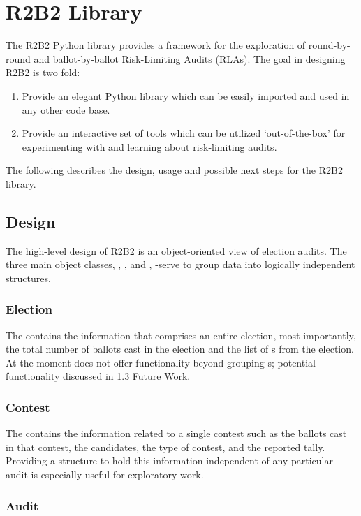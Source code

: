 \section{R2B2 Library}

The R2B2 Python library provides a framework for the exploration of round-by-round
and ballot-by-ballot Risk-Limiting Audits (RLAs). The goal in designing R2B2 is two fold:
\begin{enumerate}
    \item Provide an elegant Python library which can be easily imported and used
    in any other code base.
    \item Provide an interactive set of tools which can be utilized `out-of-the-box'
    for experimenting with and learning about risk-limiting audits.
\end{enumerate}
The following describes the design, usage and possible next steps for the R2B2 library.

\subsection{Design}

The high-level design of R2B2 is an object-oriented view of election audits.
The three main object classes, , , and ,
-serve to group data into logically independent structures.

\subsubsection{Election}
The  contains the information that comprises an entire election,
most importantly, the total number of ballots cast in the election and the list
of s from the election. At the moment  does not offer
functionality beyond grouping s; potential functionality discussed
in 1.3 Future Work.

\subsubsection{Contest}
The  contains the information related to a single
contest such as the ballots cast in that contest, the candidates, the type of contest,
and the reported tally. Providing a structure to hold this information independent of
any particular audit is especially useful for exploratory work.

\subsubsection{Audit}


